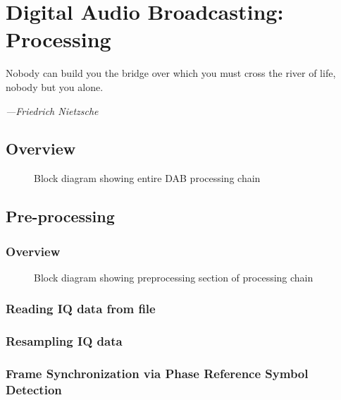 \documentclass[class=report,11pt,crop=false]{standalone}
\begin{document}
\ifstandalone
\tableofcontents
\fi
\chapter{Digital Audio Broadcasting: Processing}
\epigraph{Nobody can build you the bridge over which you must cross the river of life, nobody but you alone.}%
    {\emph{---Friedrich Nietzsche}}

\section{Overview}

\begin{figure}[htbp]
    \centering
    \def\svgwidth{\linewidth}
    { %
        }
    \caption{Block diagram showing entire DAB processing chain}
    \label{fig:BD_Overview_All}
\end{figure}

\section{Pre-processing \label{sect:dab-proc_preprocessing}}
\subsection{Overview}

\begin{figure}[htbp]
    \centering
    \def\svgwidth{\linewidth}
    { %
        }
    \caption{Block diagram showing preprocessing section of processing chain}
    \label{fig:BD_Preprocess_All}
\end{figure}

\subsection{Reading IQ data from file \label{subsect:dab-proc_iq-read}}


\subsection{Resampling IQ data \label{subsect:dab-proc_iq-resample}}


\subsection{Frame Synchronization via Phase Reference Symbol Detection \label{subsect:dab-proc_prs-detect}}
\end{document}
